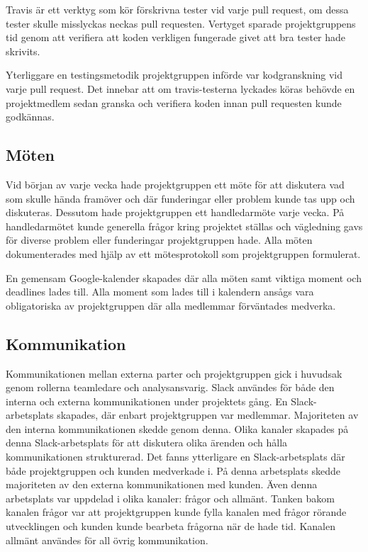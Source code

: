 Travis är ett verktyg som kör förskrivna tester vid varje pull request, om dessa tester skulle misslyckas neckas pull requesten. Vertyget sparade projektgruppens tid genom att verifiera att koden verkligen fungerade givet att bra tester hade skrivits.

Yterliggare en testingsmetodik projektgruppen införde var kodgranskning vid varje pull request. Det innebar att om travis-testerna lyckades köras behövde en projektmedlem sedan granska och verifiera koden innan pull requesten kunde godkännas.

\subsection{Möten}
Vid början av varje vecka hade projektgruppen ett möte för att diskutera vad som skulle hända framöver och där funderingar eller problem kunde tas upp och diskuteras. Dessutom hade projektgruppen ett handledarmöte varje vecka. På handledarmötet kunde generella frågor kring projektet ställas och vägledning gavs för diverse problem eller funderingar projektgruppen hade. Alla möten dokumenterades med hjälp av ett mötesprotokoll som projektgruppen formulerat.

En gemensam Google-kalender skapades där alla möten samt viktiga moment och deadlines lades till. Alla moment som lades till i kalendern ansågs vara obligatoriska av projektgruppen där alla medlemmar förväntades medverka.

\subsection{Kommunikation}
Kommunikationen mellan externa parter och projektgruppen gick i huvudsak genom rollerna teamledare och analysansvarig. Slack användes för både den interna och externa kommunikationen under projektets gång. En Slack-arbetsplats skapades, där enbart projektgruppen var medlemmar. Majoriteten av den interna kommunikationen skedde genom denna. Olika kanaler skapades på denna Slack-arbetsplats för att diskutera olika ärenden och hålla kommunikationen strukturerad. Det fanns ytterligare en Slack-arbetsplats där både projektgruppen och kunden medverkade i. På denna arbetsplats skedde majoriteten av den externa kommunikationen med kunden. Även denna arbetsplats var uppdelad i olika kanaler: frågor och allmänt. Tanken bakom kanalen frågor var att projektgruppen kunde fylla kanalen med frågor rörande utvecklingen och kunden kunde bearbeta frågorna när de hade tid. Kanalen allmänt användes för all övrig kommunikation.

